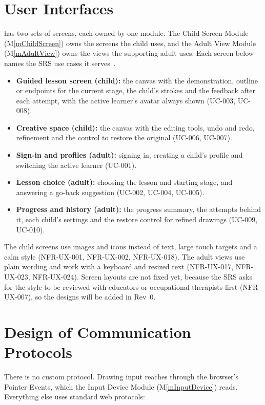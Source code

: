 \documentclass[12pt, titlepage]{article}
\newcommand{\mref}[1]{M\ref{#1}}
\begin{document}
\section{User Interfaces} \label{SecUI}

\progname{} has two sets of screens, each owned by one module. The Child Screen
Module (\mref{mChildScreen}) owns the screens the child uses, and the Adult View
Module (\mref{mAdultView}) owns the views the supporting adult uses. Each screen
below names the SRS use cases it serves~\citep{SRS}.

\begin{itemize}
\item \textbf{Guided lesson screen (child):} the canvas with the demonstration,
  outline or endpoints for the current stage, the child's strokes and the
  feedback after each attempt, with the active learner's avatar always shown
  (UC-003, UC-008).
\item \textbf{Creative space (child):} the canvas with the editing tools, undo
  and redo, refinement and the control to restore the original (UC-006,
  UC-007).
\item \textbf{Sign-in and profiles (adult):} signing in, creating a child's
  profile and switching the active learner (UC-001).
\item \textbf{Lesson choice (adult):} choosing the lesson and starting stage,
  and answering a go-back suggestion (UC-002, UC-004, UC-005).
\item \textbf{Progress and history (adult):} the progress summary, the attempts
  behind it, each child's settings and the restore control for refined drawings
  (UC-009, UC-010).
\end{itemize}

The child screens use images and icons instead of text, large touch targets and
a calm style (NFR-UX-001, NFR-UX-002, NFR-UX-018). The adult views use plain
wording and work with a keyboard and resized text (NFR-UX-017, NFR-UX-023,
NFR-UX-024). Screen layouts are not fixed yet, because the SRS asks for the
style to be reviewed with educators or occupational therapists first
(NFR-UX-007), so the designs will be added in Rev~0.

\section{Design of Communication Protocols} \label{SecProtocols}

There is no custom protocol. Drawing input reaches \progname{} through the
browser's Pointer Events, which the Input Device Module (\mref{mInputDevice})
reads. Everything else uses standard web protocols:
\end{document}
